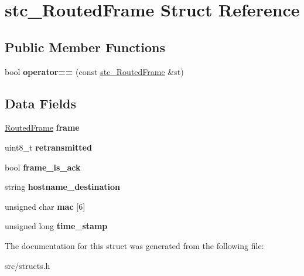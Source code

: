 \hypertarget{structstc__RoutedFrame}{\section{stc\-\_\-\-Routed\-Frame Struct Reference}
\label{structstc__RoutedFrame}
}
\subsection*{Public Member Functions}
\begin{DoxyCompactItemize}
\item 
\hypertarget{structstc__RoutedFrame_af57a16889993984ff900d612aa8cd426}{bool {\bfseries operator==} (const \hyperlink{structstc__RoutedFrame}{stc\-\_\-\-Routed\-Frame} \&st)}\label{structstc__RoutedFrame_af57a16889993984ff900d612aa8cd426}

\end{DoxyCompactItemize}
\subsection*{Data Fields}
\begin{DoxyCompactItemize}
\item 
\hypertarget{structstc__RoutedFrame_a7f85a4397b4d537344e2305553320234}{\hyperlink{classRoutedFrame}{Routed\-Frame} {\bfseries frame}}\label{structstc__RoutedFrame_a7f85a4397b4d537344e2305553320234}

\item 
\hypertarget{structstc__RoutedFrame_a09259ebbd351886987d3265bbb067ac8}{uint8\-\_\-t {\bfseries retransmitted}}\label{structstc__RoutedFrame_a09259ebbd351886987d3265bbb067ac8}

\item 
\hypertarget{structstc__RoutedFrame_a5cdfc743edd1d9d07cdb438bc5d16448}{bool {\bfseries frame\-\_\-is\-\_\-ack}}\label{structstc__RoutedFrame_a5cdfc743edd1d9d07cdb438bc5d16448}

\item 
\hypertarget{structstc__RoutedFrame_a74ab7f94fa4d89a4d57f1cc0daa6c677}{string {\bfseries hostname\-\_\-destination}}\label{structstc__RoutedFrame_a74ab7f94fa4d89a4d57f1cc0daa6c677}

\item 
\hypertarget{structstc__RoutedFrame_ac983ef308aa19abcc8bb34aa67026a2c}{unsigned char {\bfseries mac} \mbox{[}6\mbox{]}}\label{structstc__RoutedFrame_ac983ef308aa19abcc8bb34aa67026a2c}

\item 
\hypertarget{structstc__RoutedFrame_a371a0406c0644354132e9303463ba0bc}{unsigned long {\bfseries time\-\_\-stamp}}\label{structstc__RoutedFrame_a371a0406c0644354132e9303463ba0bc}

\end{DoxyCompactItemize}


The documentation for this struct was generated from the following file\-:\begin{DoxyCompactItemize}
\item 
src/structs.\-h\end{DoxyCompactItemize}
